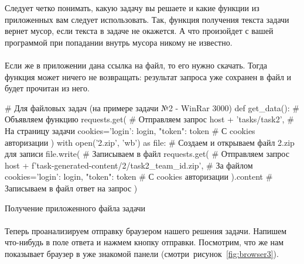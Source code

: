 \documentclass[12pt]{article}
\begin{document}
    Следует четко понимать, какую задачу вы решаете и какие функции из приложенных вам следует использовать.
    Так, функция получения текста задачи вернет мусор, если текста в задаче не окажется.
    А что произойдет с вашей программой при попадании внутрь мусора никому не известно.
    \paragraph{}
    Если же в приложении дана ссылка на файл, то его нужно скачать.
    Тогда функция может ничего не возвращать: результат запроса уже сохранен в файл и будет прочитан из него.

    \begin{listing}[H]
        \begin{pythoncode}
# Для файловых задач (на примере задачи №2 - WinRar 3000)
def get_data():                                          # Объявляем функцию
    requests.get(                                        # Отправляем запрос
        host + 'tasks/task2',                            # На страницу задачи
        cookies={'login': login, "token": token}         # С cookies авторизации
    )
    with open('2.zip', 'wb') as file:                    # Создаем и открываем файл 2.zip для записи
        file.write(                                      # Записываем в файл
            requests.get(                                # Отправляем запрос
                host + f'task-generated-content/2/task2_{team_id}.zip', # За файлом
                cookies={'login': login, "token": token} # С cookies авторизации
            ).content                                    # Записываем в файл ответ на запрос
        )
        \end{pythoncode}
        \caption{Получение приложенного файла задачи}
        \label{lst:get_data_file}
    \end{listing}
    \paragraph{}
    Теперь проанализируем отправку браузером нашего решения задачи.
    Напишем что-нибудь в поле ответа и нажмем кнопку отправки.
    Посмотрим, что же нам показывает браузер в уже знакомой панели (смотри~рисунок~\ref{fig:browser3}).
\end{document}

